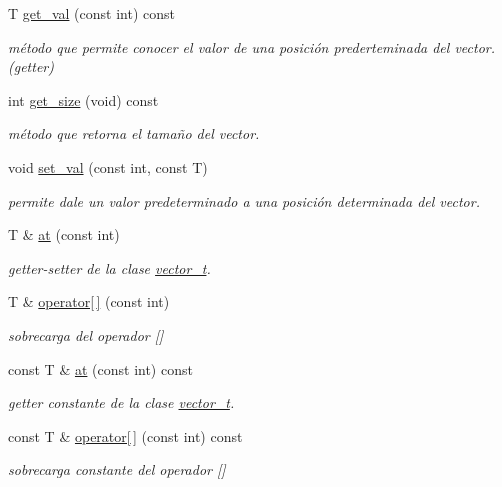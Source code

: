 \begin{DoxyCompactItemize}
T \hyperlink{classvector__t_a25f36650ee198fb731fbc804d179b37c}{get\+\_\+val} (const int) const
\begin{DoxyCompactList}\small\item\em método que permite conocer el valor de una posición prederteminada del vector. (getter) \end{DoxyCompactList}\item 
\mbox{\label{classvector__t_a43b02045137da50d6fefbe6c466a9120}} 
int \hyperlink{classvector__t_a43b02045137da50d6fefbe6c466a9120}{get\+\_\+size} (void) const
\begin{DoxyCompactList}\small\item\em método que retorna el tamaño del vector. \end{DoxyCompactList}\item 
void \hyperlink{classvector__t_a9a6ad9d61d4be782d136e486bc5d46b4}{set\+\_\+val} (const int, const T)
\begin{DoxyCompactList}\small\item\em permite dale un valor predeterminado a una posición determinada del vector. \end{DoxyCompactList}\item 
T \& \hyperlink{classvector__t_a17298d70babc63ae96d134506b01568e}{at} (const int)
\begin{DoxyCompactList}\small\item\em getter-\/setter de la clase \hyperlink{classvector__t}{vector\+\_\+t}. \end{DoxyCompactList}\item 
T \& \hyperlink{classvector__t_ab2d9aa719f4c303918deed9360dae846}{operator\mbox{[}$\,$\mbox{]}} (const int)
\begin{DoxyCompactList}\small\item\em sobrecarga del operador \mbox{[}\mbox{]} \end{DoxyCompactList}\item 
const T \& \hyperlink{classvector__t_a01fa641865ec7b579aa08b78076150d2}{at} (const int) const
\begin{DoxyCompactList}\small\item\em getter constante de la clase \hyperlink{classvector__t}{vector\+\_\+t}. \end{DoxyCompactList}\item 
const T \& \hyperlink{classvector__t_a44c63cecf539ce2b71cabe0d372f210f}{operator\mbox{[}$\,$\mbox{]}} (const int) const
\begin{DoxyCompactList}\small\item\em sobrecarga constante del operador \mbox{[}\mbox{]} \end{DoxyCompactList}\item 

\end{DoxyCompactItemize}
